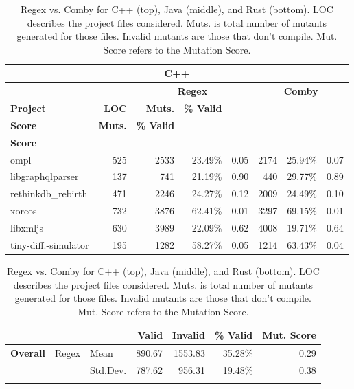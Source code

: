 \documentclass[acmsmall,screen,review,anonymous]{acmart}
\newcommand{\mc}[3]{\multicolumn{#1}{#2}{#3}}
\begin{document}
{%
\begin{table}[hbtp]
\centering
\footnotesize
\caption{Regex vs. Comby for C++ (top), Java (middle), and Rust (bottom). LOC describes the project files considered. Muts. is total number of mutants generated for those files. Invalid mutants are those that don't compile. Mut. Score refers to the Mutation Score.}
\label{tab:table_cpp1javarust}

\begin{varwidth}{.8\linewidth}
\begin{tabularx}{\linewidth}{X|r|rrr|rrr}
\bottomrule\toprule
\mc{8}{c}{\textbf{C++}} \\\midrule
                 &              & \multicolumn{3}{c|}{\textbf{Regex}} &\multicolumn{3}{c}{\textbf{Comby}}  \\
\textbf{Project} & \textbf{LOC} & \textbf{Muts.} & \textbf{\% Valid} & \makecell{\textbf{Mut.} \\ \textbf{Score}} &  \textbf{Muts.} &  \textbf{\% Valid} & \makecell{\textbf{Mut.} \\ \textbf{Score}} \\\midrule
ompl & 525 & 2533 & 23.49\% & 0.05 & 2174  & 25.94\% & 0.07  \\
{libgraphqlparser} & 137 & 741 & 21.19\% & 0.90 & 440 & 29.77\% & 0.89\\
{rethinkdb\_rebirth} &471 & 2246 & 24.27\% & 0.12 & 2009 & 24.49\% & 0.10\\
xoreos & 732  & 3876  & 62.41\% & 0.01 & 3297 & 69.15\% & 0.01\\
libxmljs &630 &  3989 & 22.09\% & 0.62 & 4008 & 19.71\% &
0.64 \\[0.5ex]
tiny-diff.-simulator &  195 & 1282 &58.27\% & 0.05 & 1214 & 63.43\% & 0.04\\
\bottomrule
\end{tabularx}
\begin{tabularx}{\linewidth}{Xllrrrr}
                  & &       & \textbf{Valid}  & \textbf{Invalid}  & \textbf{\% Valid} & \textbf{Mut. Score} \\\midrule
 \multirow{4}{*}{\textbf{Overall}} & \multirow{2}{*}{Regex} & Mean     & 890.67 &  1553.83 & 35.28\% & 0.29\\
                          & & Std.Dev. & 787.62 & 956.31   & 19.48\%  & 0.38\\\cline{2-7}

\end{tabularx}
\end{varwidth}
\end{table}}
\end{document}
